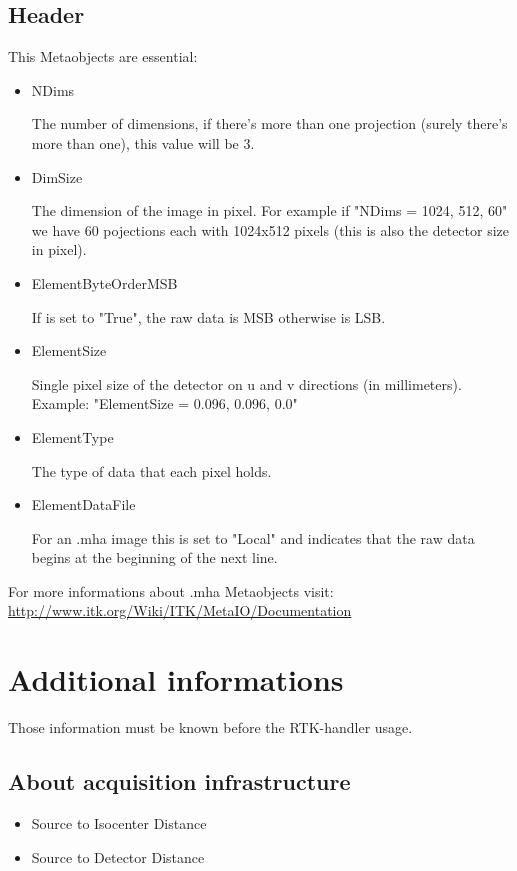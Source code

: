 \documentclass[a4paper,11pt, oneside]{article}
\begin{document}
    \subsection{ Header }
    This Metaobjects are essential:
    \begin{itemize}
    \item NDims
    \par The number of dimensions, if there's more than one projection (surely there's more than one), this value will be 3.
    \item DimSize
    \par The dimension of the image in pixel. 
    \newline 
    For example if "NDims = 1024, 512, 60" we have 60 pojections each with 1024x512 pixels (this is also the detector size in pixel). 
    \item ElementByteOrderMSB
    \par If is set to "True", the raw data is MSB otherwise is LSB.
    \item ElementSize
    \par Single pixel size of the detector on u and v directions (in millimeters). Example: "ElementSize = 0.096, 0.096, 0.0"
    \item ElementType
    \par The type of data that each pixel holds. 
    
    \item ElementDataFile
    \par For an .mha image this is set to "Local" and indicates that the raw data begins at the beginning of the next line.
    \end{itemize}
    For more informations about .mha Metaobjects visit:\newline
    \url{http://www.itk.org/Wiki/ITK/MetaIO/Documentation}
    
    \section{ Additional informations }
    Those information must be known before the RTK-handler usage.
    \subsection{ About acquisition infrastructure }
    \begin{itemize}
      \item Source to Isocenter Distance
      \item Source to Detector Distance
    \end{itemize}
\end{document}

